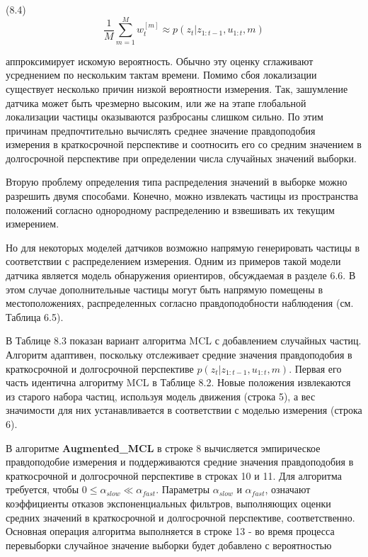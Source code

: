 \documentclass[10pt,a4paper]{article}
\begin{document}
(8.4)
$$\frac{1}{M}\sum_{m=1}^M w_t^{[m]}\approx p(z_t|z_{1:t-1},u_{1:t},m)$$

аппроксимирует искомую вероятность. Обычно эту оценку сглаживают усреднением по нескольким тактам времени. Помимо сбоя локализации существует несколько причин низкой вероятности измерения. Так, зашумление датчика может быть чрезмерно высоким, или же на этапе глобальной локализации частицы оказываются разбросаны слишком сильно. По этим причинам предпочтительно вычислять среднее значение правдоподобия измерения в краткосрочной перспективе и соотносить его со средним значением в долгосрочной перспективе при определении числа случайных значений выборки. 

Вторую проблему определения типа распределения значений в выборке можно разрешить двумя способами. Конечно, можно извлекать частицы из пространства положений согласно однородному распределению и взвешивать их текущим измерением. 

Но для некоторых моделей датчиков возможно напрямую генерировать частицы в соответствии с распределением измерения. Одним из примеров такой модели датчика является модель обнаружения ориентиров, обсуждаемая в разделе 6.6. В этом случае дополнительные частицы могут быть напрямую помещены в местоположениях, распределенных согласно правдоподобности наблюдения (см. Таблица 6.5).

В Таблице 8.3 показан вариант алгоритма MCL с добавлением случайных частиц. Алгоритм адаптивен, поскольку отслеживает средние значения правдоподобия в краткосрочной и долгосрочной перспективе $p(z_t|z_{1:t-1},u_{1:t},m)$. Первая его часть идентична алгоритму MCL в Таблице 8.2. Новые положения извлекаются из старого набора частиц, используя модель движения (строка 5), а вес значимости для них устанавливается в соответствии с моделью измерения (строка 6).

В алгоритме \textbf{Augmented\_MCL} в строке 8 вычисляется эмпирическое правдоподобие измерения и поддерживаются средние значения правдоподобия в краткосрочной и долгосрочной перспективе в строках 10 и 11.  Для алгоритма требуется, чтобы $0\leq \alpha_{slow}\ll \alpha_{fast}$.  Параметры  $\alpha_{slow}$ и $\alpha_{fast}$, означают коэффициенты отказов экспоненциальных фильтров, выполняющих оценки средних значений в краткосрочной и долгосрочной перспективе, соответственно. Основная операция алгоритма выполняется в строке 13 -  во время процесса перевыборки случайное значение выборки будет добавлено с вероятностью\\
\end{document}
